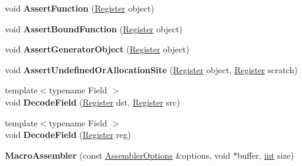 \begin{DoxyCompactItemize}
\item 
\mbox{\label{classv8_1_1internal_1_1MacroAssembler_aa8d13935f0543f10e23d7b44595f48bb}} 
void {\bfseries Assert\+Function} (\mbox{\hyperlink{classv8_1_1internal_1_1Register}{Register}} object)
\item 
\mbox{\label{classv8_1_1internal_1_1MacroAssembler_acbd0894b4e268684a580f99882497aed}} 
void {\bfseries Assert\+Bound\+Function} (\mbox{\hyperlink{classv8_1_1internal_1_1Register}{Register}} object)
\item 
\mbox{\label{classv8_1_1internal_1_1MacroAssembler_aa71ed557199e69728a422efb18e8fc65}} 
void {\bfseries Assert\+Generator\+Object} (\mbox{\hyperlink{classv8_1_1internal_1_1Register}{Register}} object)
\item 
\mbox{\label{classv8_1_1internal_1_1MacroAssembler_ac5a6e24ffce5d432cf0bf668b8460ff5}} 
void {\bfseries Assert\+Undefined\+Or\+Allocation\+Site} (\mbox{\hyperlink{classv8_1_1internal_1_1Register}{Register}} object, \mbox{\hyperlink{classv8_1_1internal_1_1Register}{Register}} scratch)
\item 
\mbox{\label{classv8_1_1internal_1_1MacroAssembler_a255a40c7f619cdf00e2b66de3afaf6f1}} 
{\footnotesize template$<$typename Field $>$ }\\void {\bfseries Decode\+Field} (\mbox{\hyperlink{classv8_1_1internal_1_1Register}{Register}} dst, \mbox{\hyperlink{classv8_1_1internal_1_1Register}{Register}} src)
\item 
\mbox{\label{classv8_1_1internal_1_1MacroAssembler_a132efbdb5d6abe37ed26edc851c715f0}} 
{\footnotesize template$<$typename Field $>$ }\\void {\bfseries Decode\+Field} (\mbox{\hyperlink{classv8_1_1internal_1_1Register}{Register}} reg)
\item 
\mbox{\label{classv8_1_1internal_1_1MacroAssembler_ab454c229ecab5061af905b7d5959c919}} 
{\bfseries Macro\+Assembler} (const \mbox{\hyperlink{structv8_1_1internal_1_1AssemblerOptions}{Assembler\+Options}} \&options, void $\ast$buffer, \mbox{\hyperlink{classint}{int}} size)

\end{DoxyCompactItemize}
